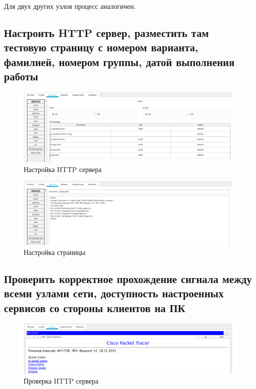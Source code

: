 \documentclass[12pt]{report}
\begin{document}
Для двух других узлов процесс аналогичен.

\subsection*{Настроить HTTP сервер, разместить там тестовую страницу с номером варианта, фамилией, номером группы, датой выполнения работы}

\begin{figure}[H]
	\begin{center}
		\includegraphics[scale=0.4]{img/13.png}
	\end{center}
	\caption{Настройка HTTP сервера}
	\label{fig:13}
\end{figure}

\begin{figure}[H]
	\begin{center}
		\includegraphics[scale=0.4]{img/14.png}
	\end{center}
	\caption{Настройка страницы}
	\label{fig:14}
\end{figure}

\subsection*{Проверить корректное прохождение сигнала между всеми узлами сети, доступность настроенных сервисов со стороны клиентов на ПК}

\begin{figure}[H]
	\begin{center}
		\includegraphics[scale=0.45]{img/15.png}
	\end{center}
	\caption{Проверка HTTP сервера}
	\label{fig:15}
\end{figure}
\end{document}
